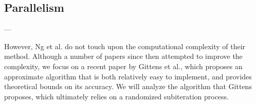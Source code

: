 \subsection{Parallelism}

---

However, Ng et al. do not touch upon the computational complexity of their
method. Although a number of papers since then attempted to improve the
complexity, we focus on a recent paper by Gittens et
al.\cite{gittens2013approximate}, which proposes an approximate algorithm that
is both relatively easy to implement, and provides theoretical bounds on its
accuracy. We will analyze the algorithm that Gittens proposes, which ultimately
relies on a randomized subiteration process.
